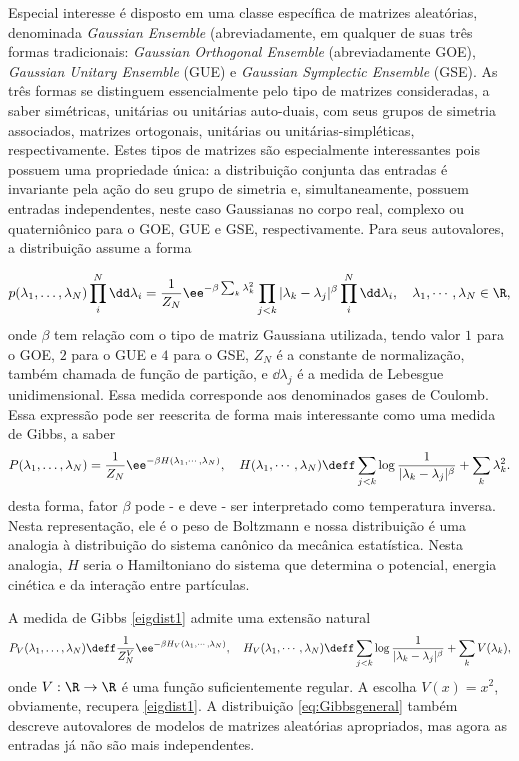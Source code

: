 Especial interesse é disposto em uma classe específica de matrizes aleatórias, denominada \textit{Gaussian Ensemble} (abreviadamente, em qualquer de suas três formas tradicionais:  \textit{Gaussian Orthogonal Ensemble} (abreviadamente GOE), \textit{Gaussian Unitary Ensemble} (GUE) e \textit{Gaussian Symplectic Ensemble} (GSE). As três formas se distinguem essencialmente pelo tipo de matrizes consideradas, a saber simétricas, unitárias ou unitárias auto-duais, com seus grupos de simetria associados, matrizes ortogonais, unitárias ou unitárias-simpléticas, respectivamente. Estes tipos de matrizes são especialmente interessantes pois possuem uma propriedade única: a distribuição conjunta das entradas é invariante pela ação do seu grupo de simetria e, simultaneamente, possuem entradas independentes, neste caso Gaussianas no corpo real, complexo ou quaterniônico para o GOE, GUE e GSE, respectivamente. Para seus autovalores, a distribuição assume a forma

\begin{equation}
	p(\lambda_1, \ldots, \lambda_N) \prod_{i}^{N}\dd \lambda_i = \frac{1}{Z_N} \ee^{-\beta \sum_{k}\lambda_k^2}\prod_{j<k}|\lambda_k - \lambda_j|^\beta \prod_{i}^{N}\dd \lambda_i , \quad \lambda_1,\cdots, \lambda_N\in \R,
	\label{eq: coulomb}
\end{equation}
%
onde $\beta$ tem relação com o tipo de matriz Gaussiana utilizada, tendo valor $1$ para o GOE, $2$ para o GUE e $4$ para o GSE, $Z_N$ é a constante de normalização, também chamada de função de partição, e $\dd\lambda_j$ é a medida de Lebesgue unidimensional. Essa medida corresponde aos denominados gases de Coulomb. Essa expressão pode ser reescrita de forma mais interessante como uma medida de Gibbs, a saber
\begin{equation}\label{eigdist1}
	P(\lambda_1, \ldots, \lambda_N)  = \frac{1}{Z_N} \ee^{-\beta H(\lambda_1,\cdots,\lambda_N)},\quad H(\lambda_1,\cdots,\lambda_N)\deff \sum_{j<k}\log\frac{1}{|\lambda_k - \lambda_j|^\beta}+\sum_{k}\lambda_k^2.
\end{equation}
desta forma, fator $\beta$ pode - e deve - ser interpretado como temperatura inversa. Nesta representação, ele é o peso de Boltzmann e nossa distribuição é uma analogia à distribuição do sistema canônico da mecânica estatística. Nesta analogia, $H$ seria o Hamiltoniano do sistema que determina o potencial, energia cinética e da interação entre partículas.

A medida de Gibbs \eqref{eigdist1} admite uma extensão natural
%
\begin{equation}\label{eq:Gibbsgeneral}
	P_V(\lambda_1,\hdots,\lambda_N)\deff \frac{1}{Z^V_N}\ee^{-\beta H_V(\lambda_1,\cdots, \lambda_N)},\quad H_V(\lambda_1,\cdots,\lambda_N)\deff  \sum_{j<k}\log\frac{1}{|\lambda_k - \lambda_j|^\beta}+\sum_{k}V(\lambda_k),
\end{equation}
%
onde $V:\R\to \R$ é uma função suficientemente regular. A escolha $V(x)=x^2$, obviamente, recupera \eqref{eigdist1}. A distribuição \eqref{eq:Gibbsgeneral} também descreve autovalores de modelos de matrizes aleatórias apropriados, mas agora as entradas já não são mais independentes.